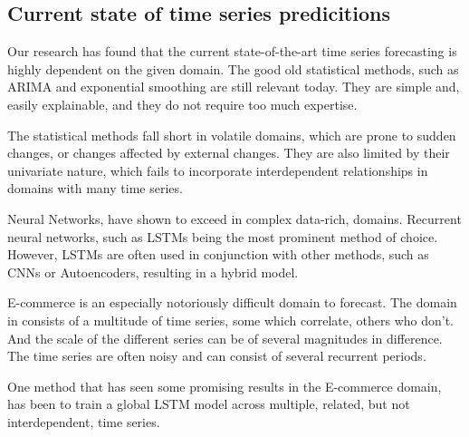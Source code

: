 \subsection{Current state of time series predicitions}

Our research has found that the current state-of-the-art time series forecasting is highly dependent
on the given domain. The good old statistical methods, such as ARIMA and exponential smoothing 
are still relevant today. They are simple and, easily explainable, and they do not require 
too much expertise.

The statistical methods fall short in volatile domains, which are prone to sudden changes,
or changes affected by external changes. They are also limited by their univariate nature, which fails to 
incorporate interdependent relationships in domains with many time series.

Neural Networks, have shown to exceed in complex data-rich, domains. Recurrent neural networks, such as LSTMs being the most
prominent method of choice. However, LSTMs are often used in conjunction with other methods, such as CNNs or Autoencoders,
resulting in a hybrid model.

E-commerce is an especially notoriously difficult domain to forecast. The domain in consists of a multitude of time series,
some which correlate, others who don't. And the scale of the different series can be of several magnitudes in difference.
The time series are often noisy and can consist of several recurrent periods.

One method that has seen some promising results in the E-commerce domain, has been to train a global LSTM model across multiple,
related, but not interdependent, time series.



